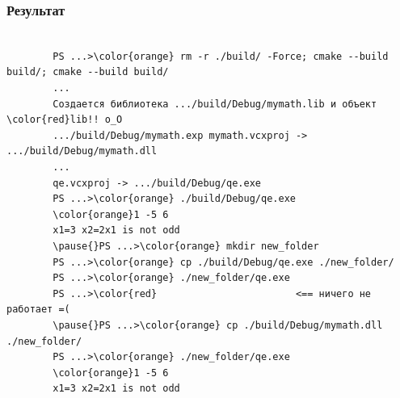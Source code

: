 \documentclass[9pt, aspectratio=1610]{beamer}
\begin{document}
\begin{frame}[fragile]\frametitle{Результат}
	
		\begin{Verbatim}[bgcolor=black,tabsize=4,formatcom=\color{white},gobble=2,fontsize=\small, commandchars=\\\{\}, xleftmargin=0em, frame=single,framerule=0pt ,rulecolor=\color{red},framesep=1em,fillcolor=\color{black}]
			
		PS ...>\color{orange} rm -r ./build/ -Force; cmake --build build/; cmake --build build/
		...
		Создается библиотека .../build/Debug/mymath.lib и объект  \color{red}lib!! о_О    
		.../build/Debug/mymath.exp mymath.vcxproj -> .../build/Debug/mymath.dll
		...
		qe.vcxproj -> .../build/Debug/qe.exe
		PS ...>\color{orange} ./build/Debug/qe.exe
		\color{orange}1 -5 6
		x1=3 x2=2x1 is not odd
		\pause{}PS ...>\color{orange} mkdir new_folder
		PS ...>\color{orange} cp ./build/Debug/qe.exe ./new_folder/
		PS ...>\color{orange} ./new_folder/qe.exe
		PS ...>\color{red}                        <== ничего не работает =(
		\pause{}PS ...>\color{orange} cp ./build/Debug/mymath.dll ./new_folder/
		PS ...>\color{orange} ./new_folder/qe.exe
		\color{orange}1 -5 6
		x1=3 x2=2x1 is not odd
		
		
	\end{Verbatim}
\end{frame}
	
\end{document}
